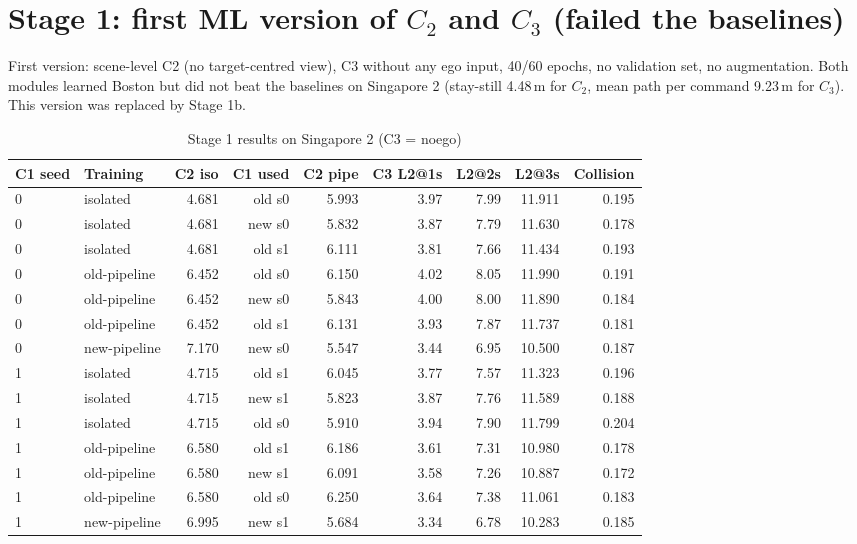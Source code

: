 \documentclass[10pt,a4paper]{article}
\begin{document}
\section{Stage 1: first ML version of $C_2$ and $C_3$ (failed the baselines)}
First version: scene-level C2 (no target-centred view), C3 without any ego input, 40/60 epochs, no validation set, no augmentation.
Both modules learned Boston but did not beat the baselines on Singapore 2
(stay-still 4.48\,m for $C_2$, mean path per command 9.23\,m for $C_3$).
This version was replaced by Stage 1b.
\begin{table}[h]\centering\scriptsize\caption{Stage 1 results on Singapore 2 (C3 = noego)}
\begin{tabular}{llrrrrrrr}\toprule
C1 seed & Training & C2 iso & C1 used & C2 pipe & C3 L2@1s & L2@2s & L2@3s & Collision\\\midrule
0 & isolated & 4.681 & old s0 & 5.993 & 3.97 & 7.99 & 11.911 & 0.195\\
0 & isolated & 4.681 & new s0 & 5.832 & 3.87 & 7.79 & 11.630 & 0.178\\
0 & isolated & 4.681 & old s1 & 6.111 & 3.81 & 7.66 & 11.434 & 0.193\\
0 & old-pipeline & 6.452 & old s0 & 6.150 & 4.02 & 8.05 & 11.990 & 0.191\\
0 & old-pipeline & 6.452 & new s0 & 5.843 & 4.00 & 8.00 & 11.890 & 0.184\\
0 & old-pipeline & 6.452 & old s1 & 6.131 & 3.93 & 7.87 & 11.737 & 0.181\\
0 & new-pipeline & 7.170 & new s0 & 5.547 & 3.44 & 6.95 & 10.500 & 0.187\\
1 & isolated & 4.715 & old s1 & 6.045 & 3.77 & 7.57 & 11.323 & 0.196\\
1 & isolated & 4.715 & new s1 & 5.823 & 3.87 & 7.76 & 11.589 & 0.188\\
1 & isolated & 4.715 & old s0 & 5.910 & 3.94 & 7.90 & 11.799 & 0.204\\
1 & old-pipeline & 6.580 & old s1 & 6.186 & 3.61 & 7.31 & 10.980 & 0.178\\
1 & old-pipeline & 6.580 & new s1 & 6.091 & 3.58 & 7.26 & 10.887 & 0.172\\
1 & old-pipeline & 6.580 & old s0 & 6.250 & 3.64 & 7.38 & 11.061 & 0.183\\
1 & new-pipeline & 6.995 & new s1 & 5.684 & 3.34 & 6.78 & 10.283 & 0.185\\
\bottomrule\end{tabular}\end{table}
\FloatBarrier
\end{document}
